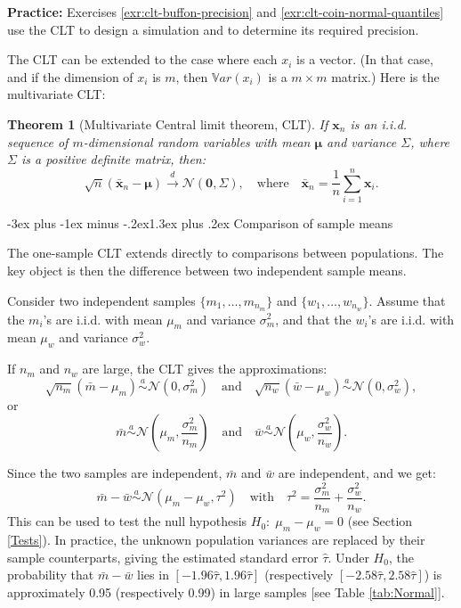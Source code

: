 \documentclass[
  11pt,
]{book}
\makeatletter
\renewcommand\section{\@startsection{section}{1}{\z@}
  {-3ex plus -1ex minus -.2ex}{1.3ex plus .2ex}
  {\normalfont\Large\bfseries\color{TextbookInk}}}
\newtheorem{theorem}{Theorem}[chapter]
\theoremstyle{definition}
\theoremstyle{definition}
\theoremstyle{definition}
\theoremstyle{definition}
\theoremstyle{remark}
\makeatother
\begin{document}
\textbf{Practice:} Exercises \ref{exr:clt-buffon-precision} and \ref{exr:clt-coin-normal-quantiles} use the CLT to design a simulation and to determine its required precision.

The CLT can be extended to the case where each \(x_i\) is a vector. (In that case, and if the dimension of \(x_i\) is \(m\), then \(\mathbb{V}ar(x_i)\) is a \(m\times m\) matrix.) Here is the multivariate CLT:

\begin{theorem}[Multivariate Central limit theorem, CLT]
\protect\hypertarget{thm:MCLT}{}\label{thm:MCLT}If \(\mathbf{x}_n\) is an i.i.d. sequence of \(m\)-dimensional random variables with mean \(\boldsymbol\mu\) and variance \(\Sigma\), where \(\Sigma\) is a positive definite matrix, then:
\[
\boxed{\sqrt{n} (\bar{\mathbf{x}}_n - \boldsymbol\mu) \overset{d}{\rightarrow} \mathcal{N}(\mathbf{0},\Sigma), \quad \mbox{where} \quad \bar{\mathbf{x}}_n = \frac{1}{n} \sum_{i=1}^{n} \mathbf{x}_i.}
\]
\end{theorem}

\section{Comparison of sample means}\label{comparison-means}

The one-sample CLT extends directly to comparisons between populations. The key object is then the difference between two independent sample means.

Consider two independent samples \(\{m_1,\dots,m_{n_m}\}\) and \(\{w_1,\dots,w_{n_w}\}\). Assume that the \(m_i\)'s are i.i.d. with mean \(\mu_m\) and variance \(\sigma_m^2\), and that the \(w_i\)'s are i.i.d. with mean \(\mu_w\) and variance \(\sigma_w^2\).

If \(n_m\) and \(n_w\) are large, the CLT gives the approximations:
\[
\sqrt{n_m}(\bar{m} - \mu_m) \overset{a}{\sim} \mathcal{N}(0,\sigma^2_m) \quad \mbox{and} \quad \sqrt{n_w}(\bar{w} - \mu_w) \overset{a}{\sim} \mathcal{N}(0,\sigma^2_w),
\]
or
\[
\bar{m} \overset{a}{\sim} \mathcal{N}\left(\mu_m,\frac{\sigma^2_m}{n_m}\right) \quad \mbox{and} \quad \bar{w} \overset{a}{\sim} \mathcal{N}\left(\mu_w,\frac{\sigma^2_w}{n_w}\right).
\]

Since the two samples are independent, \(\bar{m}\) and \(\bar{w}\) are independent, and we get:
\[
\bar{m} - \bar{w} \overset{a}{\sim} \mathcal{N}\left(\mu_m-\mu_w,\tau^2\right) \quad \mbox{with} \quad \tau^2 = \frac{\sigma^2_m}{n_m}+\frac{\sigma^2_w}{n_w}.
\]
This can be used to test the null hypothesis \(H_0: \; \mu_m-\mu_w = 0\) (see Section \ref{Tests}). In practice, the unknown population variances are replaced by their sample counterparts, giving the estimated standard error \(\hat\tau\). Under \(H_0\), the probability that \(\bar{m}-\bar{w}\) lies in \([-1.96\hat\tau,1.96\hat\tau]\) (respectively \([-2.58\hat\tau,2.58\hat\tau]\)) is approximately 0.95 (respectively 0.99) in large samples {[}see Table \ref{tab:Normal}{]}.
\end{document}
